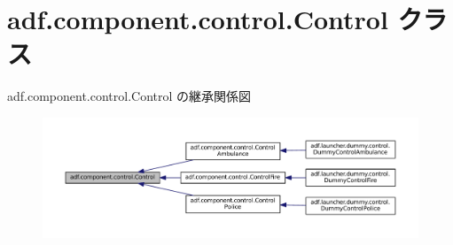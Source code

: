 \hypertarget{classadf_1_1component_1_1control_1_1Control}{}\section{adf.\+component.\+control.\+Control クラス}
\label{classadf_1_1component_1_1control_1_1Control}


adf.\+component.\+control.\+Control の継承関係図
\nopagebreak
\begin{figure}[H]
\begin{center}
\leavevmode
\includegraphics[width=350pt]{classadf_1_1component_1_1control_1_1Control__inherit__graph}
\end{center}
\end{figure}
